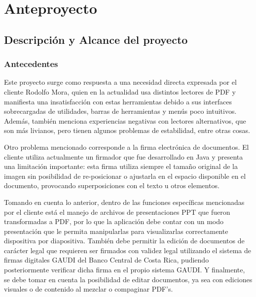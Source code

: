 \chapter{Anteproyecto}

\section{Descripción y Alcance del proyecto}
\subsection{Antecedentes}


Este proyecto surge como respuesta a una necesidad directa expresada por el cliente Rodolfo Mora, quien en la actualidad usa distintos lectores de PDF y manifiesta una insatisfacción con estas herramientas debido a sus interfaces sobrecargadas de utilidades, barras de herramientas y menús poco intuitivos. Además, también menciona experiencias negativas con lectores alternativos, que son más livianos, pero tienen algunos problemas de estabilidad, entre otras cosas.

Otro problema mencionado corresponde a la firma electrónica de documentos. El cliente utiliza actualmente un firmador que fue desarrollado en Java y presenta una limitación importante: esta firma utiliza siempre el tamaño original de la imagen sin posibilidad de re-posicionar o ajustarla en el espacio disponible en el documento, provocando superposiciones con el texto u otros elementos.

Tomando en cuenta lo anterior, dentro de las funciones específicas mencionadas por el cliente está el manejo de archivos de presentaciones PPT que fueron transformadas a PDF, por lo que la aplicación debe contar con un modo presentación que le permita manipularlas para visualizarlas correctamente dispositiva por diapositiva. También debe permitir la edición de documentos de carácter legal que requieren ser firmados con validez legal utilizando el sistema de firmas digitales GAUDI del Banco Central de Costa Rica, pudiendo posteriormente verificar dicha firma en el propio sistema GAUDI. Y finalmente, se debe tomar en cuenta la posibilidad de editar documentos, ya sea con ediciones visuales o de contenido al mezclar o compaginar PDF's.

